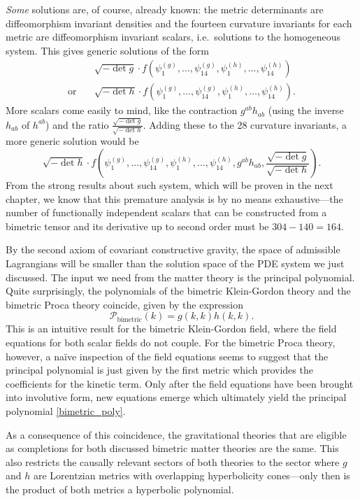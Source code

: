 \emph{Some} solutions are, of course, already known: the metric determinants are diffeomorphism invariant densities and the fourteen curvature invariants for each metric are diffeomorphism invariant scalars, i.e.\ solutions to the homogeneous system. This gives generic solutions of the form
\begin{equation}
  \begin{aligned}
  {}& \sqrt{-\operatorname{det}g}\cdot f(\psi^{(g)}_1,\dots,\psi^{(g)}_{14},\psi^{(h)}_1,\dots,\psi^{(h)}_{14}) \\
    \text{or}\quad{}& \sqrt{-\operatorname{det}h}\cdot f(\psi^{(g)}_1,\dots,\psi^{(g)}_{14},\psi^{(h)}_1,\dots,\psi^{(h)}_{14}).
  \end{aligned}
\end{equation}
More scalars come easily to mind, like the contraction $g^{ab} h_{ab}$ (using the inverse $h_{ab}$ of $h^{ab}$) and the ratio $\frac{\sqrt{-\operatorname{det}g}}{\sqrt{-\operatorname{det}h}}$. Adding these to the 28 curvature invariants, a more generic solution would be
\begin{equation}
  \sqrt{-\operatorname{det}h}\cdot f(\psi^{(g)}_1,\dots,\psi^{(g)}_{14},\psi^{(h)}_1,\dots,\psi^{(h)}_{14},g^{ab}h_{ab}, \frac{\sqrt{-\operatorname{det}g}}{\sqrt{-\operatorname{det}h}}).
\end{equation}
From the strong results about such system, which will be proven in the next chapter, we know that this premature analysis is by no means exhaustive---the number of functionally independent scalars that can be constructed from a bimetric tensor and its derivative up to second order must be $304-140=164$.

By the second axiom of covariant constructive gravity, the space of admissible Lagrangians will be smaller than the solution space of the PDE system we just discussed. The input we need from the matter theory is the principal polynomial. Quite surprisingly, the polynomials of the bimetric Klein-Gordon theory and the bimetric Proca theory coincide, given by the expression
\begin{equation}\label{bimetric_poly}
  \mathcal P_\text{bimetric}(k) = g(k,k) h(k,k).
\end{equation}
This is an intuitive result for the bimetric Klein-Gordon field, where the field equations for both scalar fields do not couple. For the bimetric Proca theory, however, a na\"ive inspection of the field equations seems to suggest that the principal polynomial is just given by the first metric which provides the coefficients for the kinetic term. Only after the field equations have been brought into involutive form, new equations emerge which ultimately yield the principal polynomial \eqref{bimetric_poly}. \cite{Wierzba_2018}

As a consequence of this coincidence, the gravitational theories that are eligible as completions for both discussed bimetric matter theories are the same. This also restricts the causally relevant sectors of both theories to the sector where $g$ and $h$ are Lorentzian metrics with overlapping hyperbolicity cones---only then is the product of both metrics a hyperbolic polynomial.

